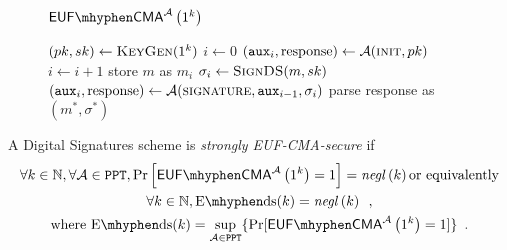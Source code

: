   \begin{figure}[!htbp]
    \begin{gamebox}{$\mathsf{EUF \mhyphen CMA}^{\adversary}\left(1^k\right)$}
      \begin{algorithmic}[1]
        \State $(pk, sk) \gets \textsc{KeyGen}(1^k)$
        \State $i \gets 0$
        \State $(\mathtt{aux}_i, \mathrm{response}) \gets
        \mathcal{A}(\textsc{init}, pk)$
          \State $i \gets i + 1$
          \State store $m$ as $m_i$
          \State $\sigma_i \gets \textsc{SignDS}(m, sk)$
          \State $(\mathtt{aux}_i, \mathrm{response}) \gets
          \mathcal{A}(\textsc{signature}, \mathtt{aux}_{i-1}, \sigma_i)$
        \EndWhile
        \State parse response as $(m^*, \sigma^*)$
          \State {}
        \Else
          \State {}
        \EndIf
      \end{algorithmic}
    \end{gamebox}
    \caption{}
    \label{game:ds}
  \end{figure}
  \begin{definition}
    \label{def:ds:secure}
    A Digital Signatures scheme is \emph{strongly \textsf{EUF-CMA}-secure} if
    \begin{gather*}
      \forall k \in \mathbb{N}, \forall \adversary \in \mathtt{PPT},
      \Pr\left[\mathsf{EUF \mhyphen CMA}^{\adversary}\left(1^k\right) = 1\right]
      = \mathit{negl}\left(k\right) \text{or equivalently} \\
      \forall k \in \mathbb{N}, \mathrm{E \mhyphen ds}(k) =
      \mathit{negl}\left(k\right) \enspace, \\
      \text{where } \mathrm{E \mhyphen ds}(k) = \underset{\adversary \in
      \mathtt{PPT}}{\sup}\{\Pr[\mathsf{EUF \mhyphen
      CMA}^{\adversary}\left(1^k\right) = 1]\} \enspace.
    \end{gather*}
  \end{definition}
